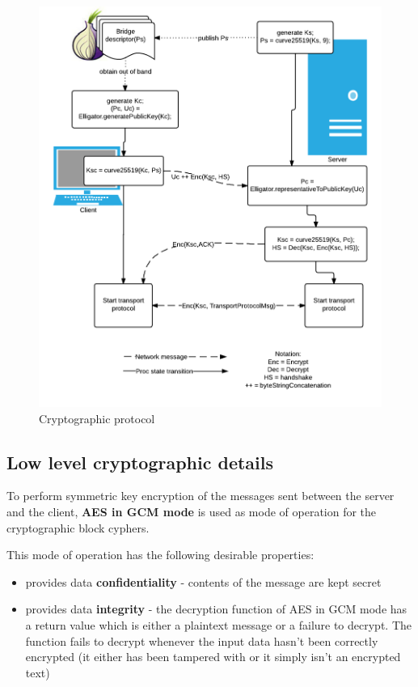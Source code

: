 \documentclass[11pt]{book} %
\begin{document}
\begin{figure}[h!]
\begin{center}
\includegraphics[scale=0.48]{cryptoProtocol}
\end{center}
 \caption{Cryptographic protocol}
 \label{fig:protocolDiagram}
 \end{figure}


\subsection{Low level cryptographic details}

To perform symmetric key encryption of the messages sent between the server and the client, \textbf{AES in GCM mode} is used as mode of operation for the cryptographic block cyphers.

This mode of operation has the following desirable properties:
\begin{itemize}
\item provides data \textbf{confidentiality} - contents of the message are kept secret
\item provides data \textbf{integrity} - the decryption function of AES in GCM mode has a return value which is either a plaintext message or a failure to decrypt. The function fails to decrypt whenever the input data hasn't been correctly encrypted (it either has been tampered with or it simply isn't an encrypted text)
\end{itemize}
\end{document}
